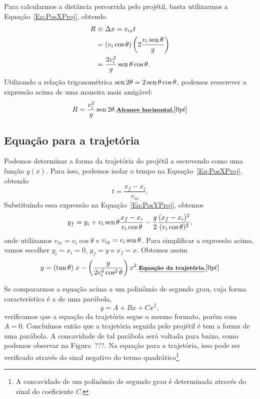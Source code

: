 Para calcularmos a distância percorrida pelo projétil, basta utilizarmos a Equação~\eqref{Eq:PosXProj}, obtendo
\begin{align}
  R &\equiv \Delta x = v_{ix} t \\
  &= \left(v_i\cos\theta\right) \left(2\frac{v_i\operatorname{sen}\theta}{g}\right) \\
  &= \frac{2v_i^2}{g}\operatorname{sen}\theta\cos\theta.
\end{align}
%
Utilizando a relação trigonométrica $\operatorname{sen} 2\theta = 2 \operatorname{sen}\theta\cos\theta$, podemos reescrever a expressão acima de uma maneira mais amigável:
\begin{equation}
  R = \frac{v_i^2}{g}\operatorname{sen}2\theta. \relax{\footnotesize\emph{\textbf{Alcance horizontal.}}}[0pt]
\end{equation}

\subsection{Equação para a trajetória}

Podemos determinar a forma da trajetória do projétil a escrevendo como uma função $y(x)$. Para isso, podemos isolar o tempo na Equação~\eqref{Eq:PosXProj}, obtendo
\begin{equation}
  t = \frac{x_f - x_i}{v_{ix}}.
\end{equation}
%
Substituindo essa expressão na Equação~\eqref{Eq:PosYProj}, obtemos
\begin{equation}
  y_f = y_i + v_i\operatorname{sen}\theta \frac{x_f-x_i}{v_i\cos\theta} - \frac{g}{2}\frac{(x_f-x_i)^2}{(v_i\cos\theta)^2},
\end{equation}
%
onde utilizamos $v_{ix} = v_i\cos\theta$ e $v_{iy} = v_i\operatorname{sen}\theta$. Para simplificar a expressão acima, vamos escolher $y_i = x_i = 0$, $y_f = y$ e $x_f = x$. Obtemos assim
\begin{equation}
  y = (\tan\theta) \; x - \left(\frac{g}{2v_i^2\cos^2\theta}\right) x^2. \relax{\footnotesize\emph{\textbf{Equação da trajetória.}}}[0pt]
\end{equation}

Se compararmos a equação acima a um polinômio de segundo grau, cuja forma característica é a de uma parábola, 
\begin{equation}
  y = A + B x + C x^2,
\end{equation}
%
verificamos que a equação da trajetória segue o mesmo formato, porém com $A = 0$. Concluímos então que a trajetória seguida pelo projétil é tem a forma de uma parábola. A concavidade de tal parábola será voltada para baixo, como podemos observar na Figura~???. Na equação para a trajetória, isso pode ser verificado através do sinal negativo do termo quadrático\footnote{A concavidade de um polinômio de segundo grau é determinada através do sinal do coeficiente $C$.}

